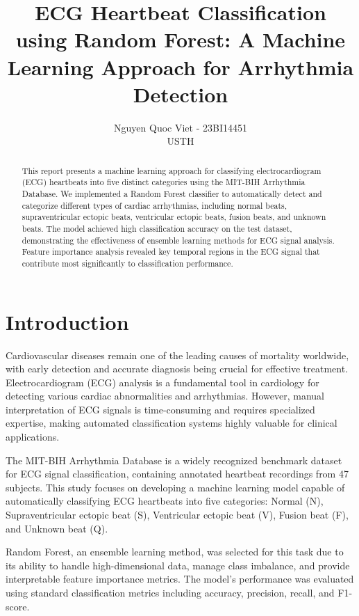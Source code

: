 \documentclass[conference]{IEEEtran}
\title{ECG Heartbeat Classification using Random Forest: A Machine Learning Approach for Arrhythmia Detection}
\author{Nguyen Quoc Viet - 23BI14451\\USTH}
\begin{document}
\maketitle

\begin{abstract}
This report presents a machine learning approach for classifying electrocardiogram (ECG) heartbeats into five distinct categories using the MIT-BIH Arrhythmia Database. We implemented a Random Forest classifier to automatically detect and categorize different types of cardiac arrhythmias, including normal beats, supraventricular ectopic beats, ventricular ectopic beats, fusion beats, and unknown beats. The model achieved high classification accuracy on the test dataset, demonstrating the effectiveness of ensemble learning methods for ECG signal analysis. Feature importance analysis revealed key temporal regions in the ECG signal that contribute most significantly to classification performance.
\end{abstract}

\section{Introduction}

Cardiovascular diseases remain one of the leading causes of mortality worldwide, with early detection and accurate diagnosis being crucial for effective treatment. Electrocardiogram (ECG) analysis is a fundamental tool in cardiology for detecting various cardiac abnormalities and arrhythmias. However, manual interpretation of ECG signals is time-consuming and requires specialized expertise, making automated classification systems highly valuable for clinical applications.

The MIT-BIH Arrhythmia Database is a widely recognized benchmark dataset for ECG signal classification, containing annotated heartbeat recordings from 47 subjects. This study focuses on developing a machine learning model capable of automatically classifying ECG heartbeats into five categories: Normal (N), Supraventricular ectopic beat (S), Ventricular ectopic beat (V), Fusion beat (F), and Unknown beat (Q).

Random Forest, an ensemble learning method, was selected for this task due to its ability to handle high-dimensional data, manage class imbalance, and provide interpretable feature importance metrics. The model's performance was evaluated using standard classification metrics including accuracy, precision, recall, and F1-score.
\end{document}
